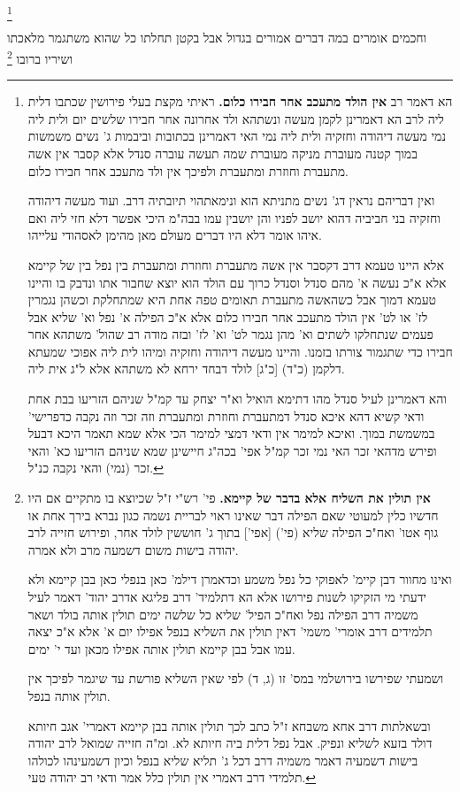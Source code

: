 \documentclass[12pt, openany]{book}
\newcommand{\footnotecomment}[1]{\footnote{#1}}
\newcommand{\commenta}[1]{\footnotecomment{#1}}
\begin{document}
{\commenta{ הא דאמר רב \textbf{אין הולד מתעכב אחר חבירו כלום.}  ראיתי מקצת בעלי פירושין שכתבו דלית ליה לרב הא דאמרינן לקמן מעשה ונשתהא ולד אחרונה אחר חבירו שלשים יום ולית ליה נמי מעשה דיהודה וחזקיה ולית ליה נמי האי דאמרינן בכתובות וביבמות ג' נשים משמשות במוך קטנה מעוברת מניקה מעוברת שמה תעשה עוברה סנדל אלא קסבר אין אשה מתעברת וחוזרת ומתעברת ולפיכך אין ולד מתעכב אחר חבירו כלום.\par ואין דבריהם נראין דג' נשים מתניתא הוא ונימאתהוי תיובתיה דרב. ועוד מעשה דיהודה וחזקיה בני חביביה דהוא יושב לפניו והן יושבין עמו בבה"מ היכי אפשר דלא חזי ליה ואם איהו אומר דלא היו דברים מעולם מאן מהימן לאסהודי עלייהו.\par  אלא היינו טעמא דרב דקסבר אין אשה מתעברת וחוזרת ומתעברת בין נפל בין של קיימא אלא א"כ נעשה א' מהם סנדל וסנדל כרוך עם הולד הוא יוצא שחבור אתו ונדבק בו והיינו טעמא דמוך אבל כשהאשה מתעברת תאומים טפה אחת היא שמתחלקת וכשהן נגמרין לז' או לט' אין הולד מתעכב אחר חבירו כלום אלא א"כ הפילה א' נפל וא' שליא אבל פעמים שנתחלקו לשתים וא' מהן נגמר לט' וא' לז' ובזה מודה רב שהול' משתהא אחר חבירו כדי שתגמור צורתו בזמנו. והיינו מעשה דיהודה וחזקיה ומיהו לית ליה אפוכי שמעתא דלקמן (כ"ד) [כ"ג] לולד דבחד ירחא לא משתהא אלא ל"ג אית ליה.\par  והא דאמרינן לעיל סנדל מהו דתימא הואיל וא"ר יצחק עד קמ"ל שניהם הזריעו בבת אחת ודאי קשיא דהא איכא סנדל דמתעברת וחוזרת ומתעברת וזה זכר וזה נקבה כדפרישי' במשמשת במוך. ואיכא למימר אין ודאי דמצי למימר הכי אלא שמא תאמר היכא דבעל ופירש מדהאי זכר האי נמי זכר קמ"ל אפי' בכה"ג חיישינן שמא שניהם הזריעו כא' והאי זכר (נמי) והאי נקבה כנ"ל. }

וחכמים אומרים  במה דברים אמורים בגדול אבל בקטן תחלתו כל שהוא  משתגמר מלאכתו ושיריו ברובו 
\commenta{\textbf{אין תולין את השליח אלא בדבר של קיימא.}  פי' רש"י ז"ל שכיוצא בו מתקיים אם היו חדשיו כלין למעוטי שאם הפילה דבר שאינו ראוי לבריית נשמה כגון נברא בירך אחת או גוף אטו' ואח"כ הפילה שליא (פי') [אפי'] בתוך ג' חוששין לולד אחר, ופירוש חזייה לרב יהודה בישות משום דשמעה מרב ולא אמרה.\par ואינו מחוור דבן קיימ' לאפוקי כל נפל משמע וכדאמרן דילמ' כאן בנפלי כאן בבן קיימא ולא ידעתי מי הזקיקו לשנות פירושו אלא הא דתלמיד' דרב פליגא אדרב יהוד' דאמר לעיל משמיה דרב הפילה נפל ואח"כ הפיל' שליא כל שלשה ימים תולין אותה בולד ושאר תלמידים דרב אומרי' משמי' דאין תולין את השליא בנפל אפילו יום א' אלא א"כ יצאה עמו אבל בבן קיימא תולין אותה אפילו מכאן ועד י' ימים.\par ושמעתי שפירשו בירושלמי במס' זו (ג, ד) לפי שאין השליא פורשת עד שיגמר לפיכך אין תולין אותה בנפל.\par  ובשאלתות דרב אחא משבחא ז"ל כתב לכך תולין אותה בבן קיימא דאמרי' אגב חיותא דולד בזעא לשליא ונפיק. אבל נפל דלית ביה חיותא לא. ומ"ה חזייה שמואל לרב יהודה בישות דשמעיה דאמר משמיה דרב דכל ג' תליא שליא בנפל וכיון דשמעינהו לכולהו תלמידי דרב דאמרי אין תולין כלל אמר ודאי רב יהודה טעי. }

}
\end{document}
